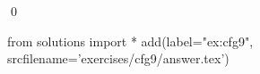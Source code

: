 
\begin{ex} 
  \label{ex:cfg9}
  
  \qed
\end{ex} 
\begin{python0}
from solutions import *
add(label="ex:cfg9",
    srcfilename='exercises/cfg9/answer.tex') 
\end{python0}
